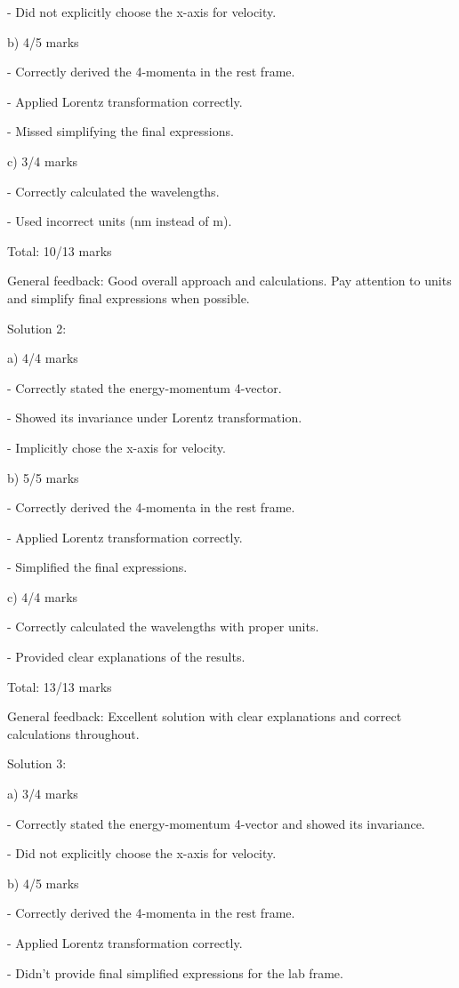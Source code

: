 \documentclass[a4paper,11pt]{article}
\begin{document}
- Did not explicitly choose the x-axis for velocity.

b) 4/5 marks

- Correctly derived the 4-momenta in the rest frame.

- Applied Lorentz transformation correctly.

- Missed simplifying the final expressions.

c) 3/4 marks

- Correctly calculated the wavelengths.

- Used incorrect units (nm instead of m).

Total: 10/13 marks

General feedback: Good overall approach and calculations. Pay attention to units and simplify final expressions when possible.

Solution 2:

a) 4/4 marks

- Correctly stated the energy-momentum 4-vector.

- Showed its invariance under Lorentz transformation.

- Implicitly chose the x-axis for velocity.

b) 5/5 marks

- Correctly derived the 4-momenta in the rest frame.

- Applied Lorentz transformation correctly.

- Simplified the final expressions.

c) 4/4 marks

- Correctly calculated the wavelengths with proper units.

- Provided clear explanations of the results.

Total: 13/13 marks

General feedback: Excellent solution with clear explanations and correct calculations throughout.

Solution 3:

a) 3/4 marks

- Correctly stated the energy-momentum 4-vector and showed its invariance.

- Did not explicitly choose the x-axis for velocity.

b) 4/5 marks

- Correctly derived the 4-momenta in the rest frame.

- Applied Lorentz transformation correctly.

- Didn't provide final simplified expressions for the lab frame.
\end{document}
